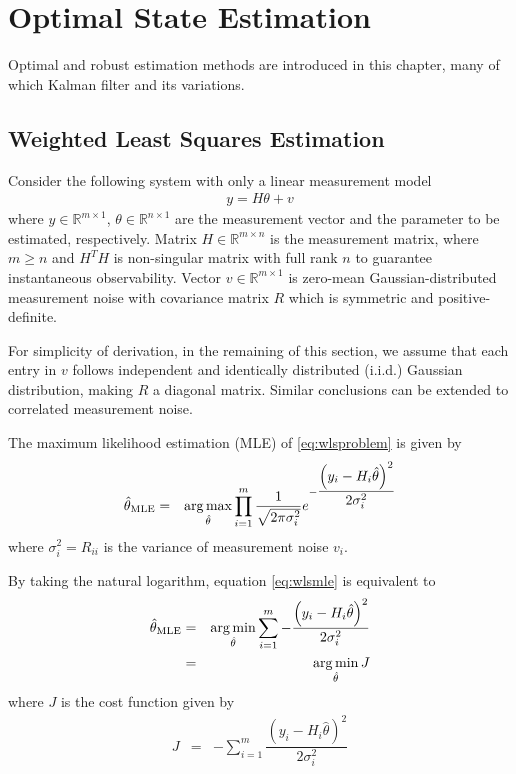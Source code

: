 \chapter{Optimal State Estimation} \label{ch:orse}

Optimal and robust estimation methods are introduced in this chapter, many of which Kalman filter and its variations.

\section{Weighted Least Squares Estimation}

Consider the following system with only a linear measurement model
\begin{eqnarray}
	y = H\theta + v \label{eq:wlsproblem}
\end{eqnarray}
where $y\in\mathbb{R}^{m\times 1}$, $\theta\in\mathbb{R}^{n\times 1}$ are the measurement vector and the parameter to be estimated, respectively. Matrix $H\in\mathbb{R}^{m\times n}$ is the measurement matrix, where $m\geq n$ and $H^TH$ is non-singular matrix with full rank $n$ to guarantee instantaneous observability. Vector $v\in\mathbb{R}^{m\times 1}$ is zero-mean Gaussian-distributed measurement noise with covariance matrix $R$ which is symmetric and positive-definite. 

For simplicity of derivation, in the remaining of this section, we assume that each entry in $v$ follows independent and identically distributed (i.i.d.) Gaussian distribution, making $R$ a diagonal matrix. Similar conclusions can be extended to correlated measurement noise.

The maximum likelihood estimation (MLE) of \eqref{eq:wlsproblem} is given by
\begin{eqnarray}
	\hat{\theta}_{\textup{MLE}} &=& \operatorname*{arg\,max}_{\hat{\theta}} \prod_{i=1}^{m} \dfrac{1}{\sqrt{2\pi\sigma_i^2}} e^{-\dfrac{\left(y_i-H_i\hat{\theta}\right)^2}{2\sigma_i^2}} \label{eq:wlsmle}
\end{eqnarray}
where $\sigma_i^2 = R_{ii}$ is the variance of measurement noise $v_i$.

By taking the natural logarithm, equation \eqref{eq:wlsmle} is equivalent to
\begin{eqnarray}
	\hat{\theta}_{\textup{MLE}} &=& \operatorname*{arg\,min}_{\hat{\theta}} \sum_{i=1}^{m} - \dfrac{\left(y_i-H_i\hat{\theta}\right)^2}{2\sigma_i^2} \nonumber \\
	&=& \operatorname*{arg\,min}_{\hat{\theta}} J \nonumber
\end{eqnarray}
where $J$ is the cost function given by
\begin{eqnarray}
	J &=& - \sum_{i=1}^{m} \dfrac{\left(y_i-H_i\hat{\theta}\right)^2}{2\sigma_i^2} \label{eq:wlsmle2}
\end{eqnarray}

